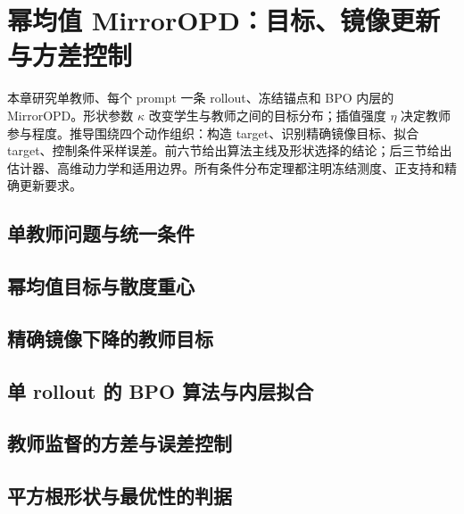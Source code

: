 \chapter{幂均值 MirrorOPD：目标、镜像更新与方差控制}
\label{ch:proximal-families}

本章研究单教师、每个 prompt 一条 rollout、冻结锚点和 BPO 内层的 MirrorOPD。形状参数 $\kappa$ 改变学生与教师之间的目标分布；插值强度 $\eta$ 决定教师参与程度。推导围绕四个动作组织：构造 target、识别精确镜像目标、拟合 target、控制条件采样误差。前六节给出算法主线及形状选择的结论；后三节给出估计器、高维动力学和适用边界。所有条件分布定理都注明冻结测度、正支持和精确更新要求。

\section{单教师问题与统一条件}
\label{sec:power-setup}


\section{幂均值目标与散度重心}
\label{sec:proximal-barycenters}



\section{精确镜像下降的教师目标}



\section{单 rollout 的 BPO 算法与内层拟合}


\section{教师监督的方差与误差控制}
\label{sec:proximal-teacher-center}





\section{平方根形状与最优性的判据}
\label{sec:power-half-and-optimality}




